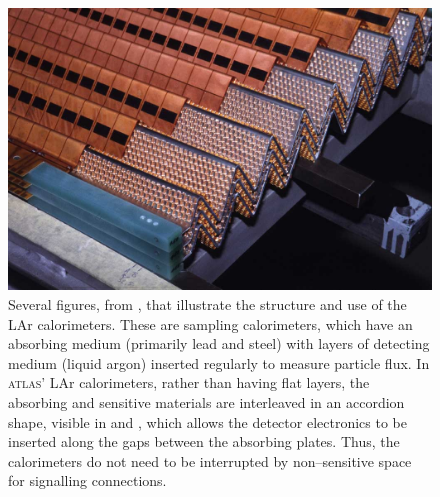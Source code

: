 \begin{figure}[htp]
\begin{minipage}[t]{.4\textwidth}
\caption{Several figures, from \cite{atlasweb}, that illustrate the structure and use of the LAr calorimeters. These are sampling calorimeters, which have an absorbing medium (primarily lead and steel) with layers of detecting medium (liquid argon) inserted regularly to measure particle flux. In \textsc{atlas}' LAr calorimeters, rather than having flat layers, the absorbing and sensitive materials are interleaved in an accordion shape, visible in  and , which allows the detector electronics to be inserted along the gaps between the absorbing plates. Thus, the calorimeters do not need to be interrupted by non--sensitive space for signalling connections.}
\end{minipage}\hfill\begin{minipage}[t]{.57\textwidth}
\phantom{p}

\phantom{p}

    \begin{center}
    \includegraphics[width=\textwidth]{larpic}\makebox[0em][r]{\textcolor{natgreen}{\rule{\textwidth}{1pt}}}
    
    \end{center}
\end{minipage}


\end{figure}
